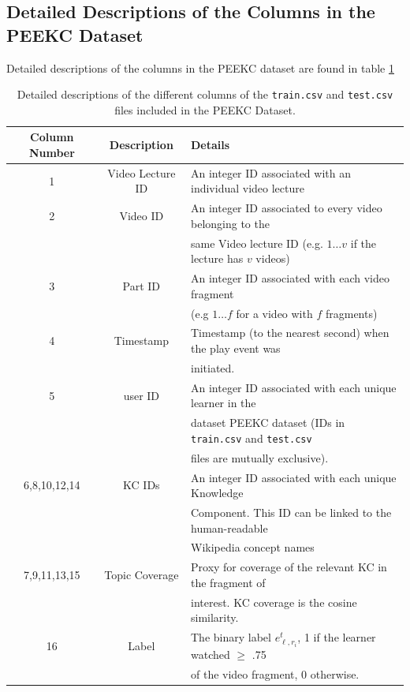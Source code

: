 \documentclass[letterpaper]{article} %
\begin{document}
\subsection{Detailed Descriptions of the Columns in the PEEKC Dataset}

Detailed descriptions of the columns in the PEEKC dataset are found in table \ref{tab:features}
\begin{table}[h] \small
\caption{Detailed descriptions of the different columns of the \texttt{train.csv} and \texttt{test.csv} files included in the PEEKC Dataset.}
\label{tab:features}
\centering
\begin{tabular}{ccl}
\hline
Column Number & Description & Details \\
\hline
1 & Video Lecture ID & An integer ID associated with an individual video lecture \\
2 & Video ID & An integer ID associated to every video belonging to the\\
& & same Video lecture ID (e.g. $1\dots v$ if the lecture has $v$ videos) \\
3 & Part ID & An integer ID associated with each video fragment \\
& & (e.g $1 \dots f$ for a video with $f$ fragments) \\
4 & Timestamp & Timestamp (to the nearest second) when the play event was \\
& &  initiated. \\
5 & user ID & An integer ID associated with each unique learner in the \\
& & dataset PEEKC dataset (IDs in \texttt{train.csv} and \texttt{test.csv} \\
& & files are mutually exclusive). \\
6,8,10,12,14 & KC IDs & An integer ID associated with each unique Knowledge \\
& & Component. This ID can be linked to the human-readable   \\
& & Wikipedia concept names \\
7,9,11,13,15 & Topic Coverage & Proxy for coverage of the relevant KC in the fragment of  \\
& & interest. KC coverage is the cosine similarity. \\
16 & Label & The binary label $e^t_{\ell,r_i}$, 1 if the learner watched $\geq$ .75 \\
& & of the video  fragment, 0 otherwise.\\
\hline
\end{tabular}
\end{table}
\end{document}

